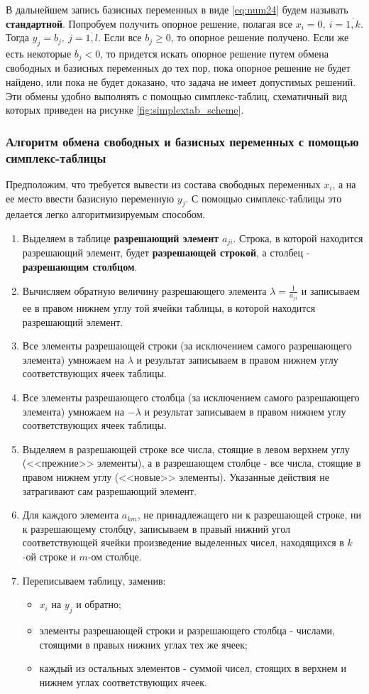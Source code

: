 \documentclass[a4paper,12pt]{report}
\begin{document}
В дальнейшем запись базисных переменных в виде \ref{eq:num24} будем называть \textbf{стандартной}. Попробуем получить опорное решение, полагая все $x_{i} = 0,\ i=\overline{1,k}$. Тогда $y_{j} = b_{j},\ j=\overline{1,l}$. Если все $b_{j} \geq 0$, то опорное решение получено. Если же есть некоторые $b_{j} < 0$, то придется искать опорное решение путем обмена свободных и базисных переменных до тех пор, пока опорное решение не будет найдено, или пока не будет доказано, что задача не имеет допустимых решений. Эти обмены удобно выполнять с помощью симплекс-таблиц, схематичный вид которых приведен на рисунке \ref{fig:simplextab_scheme}.

\subsubsection{Алгоритм обмена свободных и базисных переменных с помощью симплекс-таблицы}
Предположим, что требуется вывести из состава свободных переменных $x_{i}$, а на ее место ввести базисную переменную $y_{j}$. С помощью симплекс-таблицы это делается легко алгоритмизируемым способом.
\begin{enumerate}
\item Выделяем в таблице \textbf{разрешающий элемент} $a_{ji}$. Строка, в которой находится разрешающий элемент, будет \textbf{разрешающей строкой}, а столбец - \textbf{разрешающим столбцом}.
\item Вычисляем обратную величину разрешающего элемента $\lambda = \frac{1}{a_{ji}}$ и записываем ее в правом нижнем углу той ячейки таблицы, в которой находится разрешающий элемент.
\item Все элементы разрешающей строки (за исключением самого разрешающего элемента) умножаем на $\lambda$ и результат записываем в правом нижнем углу соответствующих ячеек таблицы.
\item Все элементы разрешающего столбца (за исключением самого разрешающего элемента) умножаем на $-\lambda$ и результат записываем в правом нижнем углу соответствующих ячеек таблицы.
\item Выделяем в разрешающей строке все числа, стоящие в левом верхнем углу (<<прежние>> элементы), а в разрешающем столбце - все числа, стоящие в правом нижнем углу (<<новые>> элементы). Указанные действия не затрагивают сам разрешающий элемент.
\item Для каждого элемента $a_{km}$, не принадлежащего ни к разрешающей строке, ни к разрешающему столбцу, записываем в правый нижний угол соответствующей ячейки произведение выделенных чисел, находящихся в $k$-ой строке и $m$-ом столбце.
\item Переписываем таблицу, заменив:
\begin{itemize}
\item $x_{i}$ на $y_{j}$ и обратно;
\item элементы разрешающей строки и разрешающего столбца - числами, стоящими в правых нижних углах тех же ячеек;
\item каждый из остальных элементов - суммой чисел, стоящих в верхнем и нижнем углах соответствующих ячеек.
\end{itemize}
\end{enumerate}
\end{document}

